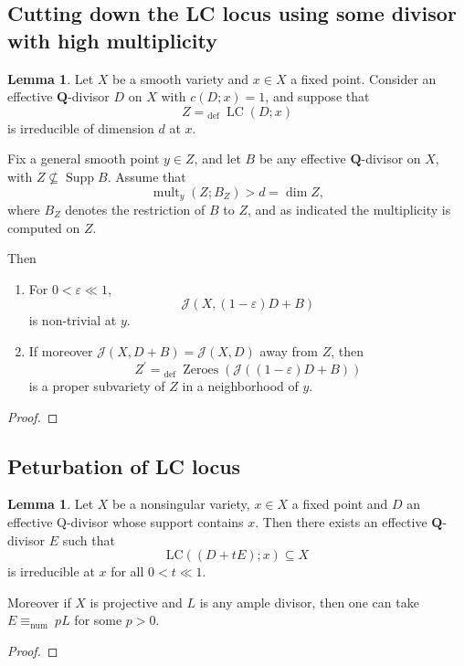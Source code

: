 \documentclass[11pt]{article}
\theoremstyle{definition}
\newtheorem{lemma}[theorem]{Lemma}
\begin{document}
	\subsection{Cutting down the LC locus using some divisor with high multiplicity}
	\begin{lemma}
		Let $X$ be a smooth variety and $x \in X$ a fixed point. Consider an effective $\mathbf{Q}$-divisor $D$ on $X$ with $c(D ; x)=1$, and suppose that
		$$
		Z={ }_{\text {def }} \operatorname{LC}(D ; x)
		$$
		is irreducible of dimension $d$ at $x$. 
		
		
		Fix a general smooth point $y \in Z$, and let $B$ be any effective $\mathbf{Q}$-divisor on $X$, with $Z \nsubseteq \operatorname{Supp} B$. Assume that
		$$
		\operatorname{mult}_y\left(Z ; B_Z\right)>d=\operatorname{dim} Z,
		$$
		where $B_Z$ denotes the restriction of $B$ to $Z$, and as indicated the multiplicity is computed on $Z$. 
		
		Then 
		\begin{enumerate}
			\item For $0<\varepsilon \ll 1$,
			$$
			\mathcal{J}(X,(1-\varepsilon) D+B)
			$$
			is non-trivial at $y$.
			\item If moreover $\mathcal{J}(X, D+B)=\mathcal{J}(X, D)$ away from $Z$, then
			$$
			Z^{\prime}={ }_{\text {def }} \operatorname{Zeroes}(\mathcal{J}((1-\varepsilon) D+B))
			$$
			is a proper subvariety of $Z$ in a neighborhood of $y$.
		\end{enumerate} 
	\end{lemma}
	\begin{proof}
		
	\end{proof}
	\subsection{Peturbation of LC locus}
	\begin{lemma}	
		Let $X$ be a nonsingular variety, $x \in X$ a fixed point and $D$ an effective $\mathrm{Q}$-divisor whose support contains $x$. Then there exists an effective $\mathbf{Q}$-divisor $E$ such that
		$$
		\mathrm{LC}((D+t E) ; x) \subseteq X
		$$
		is irreducible at $x$ for all $0<t \ll 1$. 
		
		Moreover if $X$ is projective and $L$ is any ample divisor, then one can take $E \equiv_{\text {num }} p L$ for some $p>0$.
	\end{lemma}
	\begin{proof}
		
	\end{proof}
\end{document}
